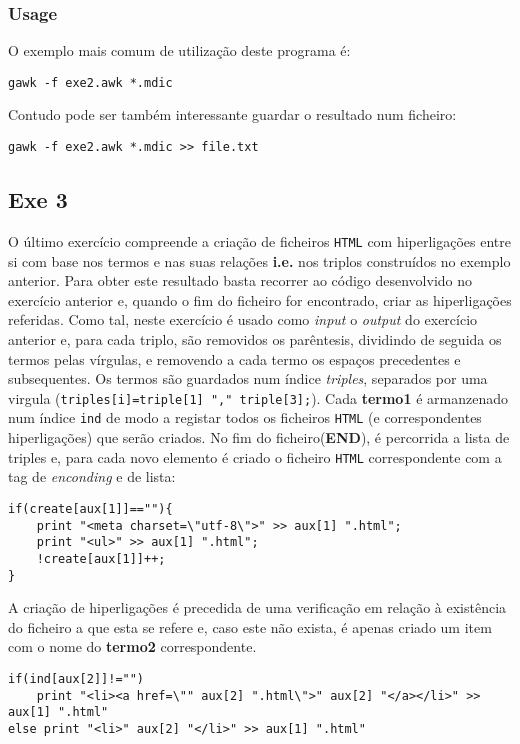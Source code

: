 \documentclass{llncs}
\begin{document}
\subsubsection{Usage}
O exemplo mais comum de utilização deste programa é:
\begin{verbatim}
gawk -f exe2.awk *.mdic
\end{verbatim}
Contudo pode ser também interessante guardar o resultado num ficheiro:
\begin{verbatim}
gawk -f exe2.awk *.mdic >> file.txt
\end{verbatim}

\subsection{Exe 3}
O último exercício compreende a criação de ficheiros \texttt{HTML} com hiperligações entre si com base nos termos e nas suas relações \textbf{i.e.} nos triplos construídos no exemplo anterior. Para obter este resultado basta recorrer ao código desenvolvido no exercício anterior e, quando o fim do ficheiro for encontrado, criar as hiperligações referidas. 
Como tal, neste exercício é usado como \textit{input} o \textit{output} do exercício anterior e, para cada triplo, são removidos os parêntesis, dividindo de seguida os termos pelas vírgulas, e removendo a cada termo os espaços precedentes e subsequentes. Os termos são guardados num índice \textit{triples}, separados por uma virgula (\verb|triples[i]=triple[1] "," triple[3];|). Cada \textbf{termo1} é armanzenado num índice \texttt{ind} de modo a registar todos os ficheiros \texttt{HTML} (e correspondentes hiperligações) que serão criados. No fim do ficheiro(\textbf{END}), é percorrida a lista de triples e, para cada novo elemento é criado o ficheiro \texttt{HTML} correspondente com a tag de \textit{enconding} e de lista:

\begin{verbatim}
if(create[aux[1]]==""){
    print "<meta charset=\"utf-8\">" >> aux[1] ".html";
    print "<ul>" >> aux[1] ".html";
    !create[aux[1]]++;
}
\end{verbatim}

A criação de hiperligações é precedida de uma verificação em relação à existência do ficheiro a que esta se refere e, caso este não exista, é apenas criado um item com o nome do \textbf{termo2} correspondente.

\begin{verbatim}
if(ind[aux[2]]!="") 
    print "<li><a href=\"" aux[2] ".html\">" aux[2] "</a></li>" >> aux[1] ".html"
else print "<li>" aux[2] "</li>" >> aux[1] ".html"
\end{verbatim}
\end{document}
